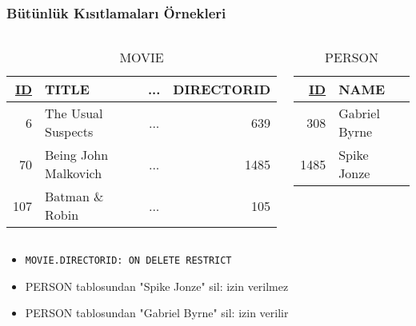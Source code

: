 \documentclass[dvipsnames]{beamer}
\theoremstyle{plain}
\begin{document}
\begin{frame}
  \frametitle{Bütünlük Kısıtlamaları Örnekleri}

  \begin{columns}
    \begin{tiny}
    \begin{table}
      \caption{MOVIE}
      \begin{tabular}{|r|l|c|r|}\hline
\underline{ID} & TITLE             & ... & DIRECTORID\\[2pt]\hline\hline
          6 & The Usual Suspects   & ... &        639\\\hline
         70 & Being John Malkovich & ... &       1485\\\hline
        107 & Batman \& Robin      & ... &        105\\\hline
      \end{tabular}
    \end{table}
    \end{tiny}

    \begin{tiny}
    \begin{table}
      \caption{PERSON}
      \begin{tabular}{|r|l|}\hline
\underline{ID} & NAME\\[2pt]\hline\hline
           308 & Gabriel Byrne\\\hline
          1485 & Spike Jonze  \\\hline
      \end{tabular}
    \end{table}
    \end{tiny}
  \end{columns}
  
  \begin{itemize}
    \item \lstinline!MOVIE.DIRECTORID: ON DELETE RESTRICT!
    \smallskip
    \item PERSON tablosundan "Spike Jonze" sil: izin verilmez
    \item PERSON tablosundan "Gabriel Byrne" sil: izin verilir
  \end{itemize}
\end{frame}
\end{document}
